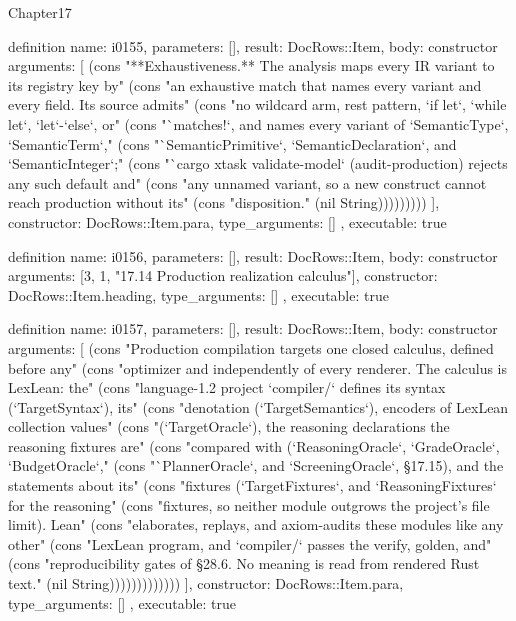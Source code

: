\begin{lexlean}{Chapter17}
\begin{semanticmodule}
definition{
  name: i0155,
  parameters: [],
  result: DocRows::Item,
  body: constructor{
    arguments: [
      (cons "**Exhaustiveness.** The analysis maps every IR variant to its registry key by" (cons "an exhaustive match that names every variant and every field. Its source admits" (cons "no wildcard arm, rest pattern, `if let`, `while let`, `let`-`else`, or" (cons "`matches!`, and names every variant of `SemanticType`, `SemanticTerm`," (cons "`SemanticPrimitive`, `SemanticDeclaration`, and `SemanticInteger`;" (cons "`cargo xtask validate-model` (audit-production) rejects any such default and" (cons "any unnamed variant, so a new construct cannot reach production without its" (cons "disposition." (nil String)))))))))
    ],
    constructor: DocRows::Item.para,
    type_arguments: []
  },
  executable: true
}

definition{
  name: i0156,
  parameters: [],
  result: DocRows::Item,
  body: constructor{
    arguments: [3, 1, "17.14 Production realization calculus"],
    constructor: DocRows::Item.heading,
    type_arguments: []
  },
  executable: true
}

definition{
  name: i0157,
  parameters: [],
  result: DocRows::Item,
  body: constructor{
    arguments: [
      (cons "Production compilation targets one closed calculus, defined before any" (cons "optimizer and independently of every renderer. The calculus is LexLean: the" (cons "language-1.2 project `compiler/` defines its syntax (`TargetSyntax`), its" (cons "denotation (`TargetSemantics`), encoders of LexLean collection values" (cons "(`TargetOracle`), the reasoning declarations the reasoning fixtures are" (cons "compared with (`ReasoningOracle`, `GradeOracle`, `BudgetOracle`," (cons "`PlannerOracle`, and `ScreeningOracle`, §17.15), and the statements about its" (cons "fixtures (`TargetFixtures`, and `ReasoningFixtures` for the reasoning" (cons "fixtures, so neither module outgrows the project's file limit). Lean" (cons "elaborates, replays, and axiom-audits these modules like any other" (cons "LexLean program, and `compiler/` passes the verify, golden, and" (cons "reproducibility gates of §28.6. No meaning is read from rendered Rust text." (nil String)))))))))))))
    ],
    constructor: DocRows::Item.para,
    type_arguments: []
  },
  executable: true
}


\end{semanticmodule}
\end{lexlean}
